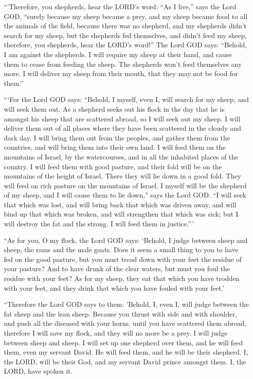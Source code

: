 ``'Therefore, you shepherds, hear the LORD's word:
 ``As I live,'' says the Lord GOD, ``surely because my sheep
became a prey, and my sheep became food to all the animals of the field,
because there was no shepherd, and my shepherds didn't search for my
sheep, but the shepherds fed themselves, and didn't feed my sheep,
 therefore, you shepherds, hear the LORD's word!''
 The Lord GOD says: ``Behold, I am against the shepherds. I
will require my sheep at their hand, and cause them to cease from
feeding the sheep. The shepherds won't feed themselves any more. I will
deliver my sheep from their mouth, that they may not be food for them.''

 ```For the Lord GOD says: ``Behold, I myself, even I, will
search for my sheep, and will seek them out.  As a shepherd
seeks out his flock in the day that he is amongst his sheep that are
scattered abroad, so I will seek out my sheep. I will deliver them out
of all places where they have been scattered in the cloudy and dark day.
 I will bring them out from the peoples, and gather them
from the countries, and will bring them into their own land. I will feed
them on the mountains of Israel, by the watercourses, and in all the
inhabited places of the country.  I will feed them with
good pasture, and their fold will be on the mountains of the height of
Israel. There they will lie down in a good fold. They will feed on rich
pasture on the mountains of Israel.  I myself will be the
shepherd of my sheep, and I will cause them to lie down,'' says the Lord
GOD.  ``I will seek that which was lost, and will bring
back that which was driven away, and will bind up that which was broken,
and will strengthen that which was sick; but I will destroy the fat and
the strong. I will feed them in justice.''\,'

 ``As for you, O my flock, the Lord GOD says: `Behold, I
judge between sheep and sheep, the rams and the male goats.
 Does it seem a small thing to you to have fed on the good
pasture, but you must tread down with your feet the residue of your
pasture? And to have drunk of the clear waters, but must you foul the
residue with your feet?  As for my sheep, they eat that
which you have trodden with your feet, and they drink that which you
have fouled with your feet.'

 ``Therefore the Lord GOD says to them: 'Behold, I, even I,
will judge between the fat sheep and the lean sheep. 
Because you thrust with side and with shoulder, and push all the
diseased with your horns, until you have scattered them abroad,
 therefore I will save my flock, and they will no more be a
prey. I will judge between sheep and sheep.  I will set up
one shepherd over them, and he will feed them, even my servant David. He
will feed them, and he will be their shepherd.  I, the
LORD, will be their God, and my servant David prince amongst them. I,
the LORD, have spoken it.

